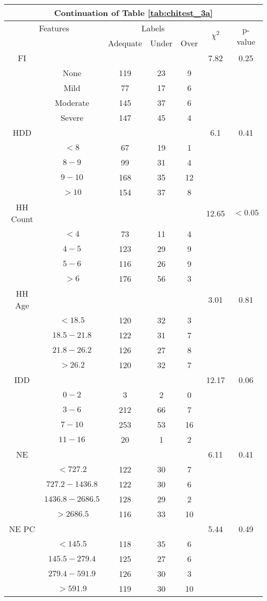 \begin{table}
\centering
\label{tab:chitest_3a_cont}
\begin{tabular}{c c | c c c| c | c}
\hline
\multicolumn{7}{c}{Continuation of Table \ref{tab:chitest_3a}}\\ 
\hline
\multicolumn{2}{c|}{Features}& \multicolumn{3}{c|}{Labels}& \multirow{2}{*}{$\chi^2$} & \multirow{2}{*}{p-value}\\ 
& & Adequate & Under & Over & & \\ 
\hline
FI &  &  &  & & 7.82 & 0.25 \\ 
& None & 119 & 23 & 9& & \\ 
& Mild & 77 & 17 & 6& & \\ 
& Moderate & 145 & 37 & 6& & \\ 
& Severe & 147 & 45 & 4& & \\ 
\hline 
HDD &  &  &  & & 6.1 & 0.41 \\ 
& $< 8$ & 67 & 19 & 1& & \\ 
& $8-9$ & 99 & 31 & 4& & \\ 
& $9-10$ & 168 & 35 & 12& & \\ 
& $> 10$ & 154 & 37 & 8& & \\ 
\hline 
HH Count &  &  &  & & 12.65 & $< 0.05$ \\ 
& $< 4$ & 73 & 11 & 4& & \\ 
& $4-5$ & 123 & 29 & 9& & \\ 
& $5-6$ & 116 & 26 & 9& & \\ 
& $> 6$ & 176 & 56 & 3& & \\ 
\hline 
HH Age &  &  &  & & 3.01 & 0.81 \\ 
& $< 18.5$ & 120 & 32 & 3& & \\ 
& $18.5-21.8$ & 122 & 31 & 7& & \\ 
& $21.8-26.2$ & 126 & 27 & 8& & \\ 
& $> 26.2$ & 120 & 32 & 7& & \\ 
\hline 
IDD &  &  &  & & 12.17 & 0.06 \\ 
& $0-2$ & 3 & 2 & 0& & \\ 
& $3-6$ & 212 & 66 & 7& & \\ 
& $7-10$ & 253 & 53 & 16& & \\ 
& $11-16$ & 20 & 1 & 2& & \\ 
\hline 
NE &  &  &  & & 6.11 & 0.41 \\ 
& $< 727.2$ & 122 & 30 & 7& & \\ 
& $727.2-1436.8$ & 122 & 30 & 6& & \\ 
& $1436.8-2686.5$ & 128 & 29 & 2& & \\ 
& $> 2686.5$ & 116 & 33 & 10& & \\ 
\hline 
NE PC &  &  &  & & 5.44 & 0.49 \\ 
& $< 145.5$ & 118 & 35 & 6& & \\ 
& $145.5-279.4$ & 125 & 27 & 6& & \\ 
& $279.4-591.9$ & 126 & 30 & 3& & \\ 
& $> 591.9$ & 119 & 30 & 10& & \\ 
\hline 
\end{tabular}
\end{table}


